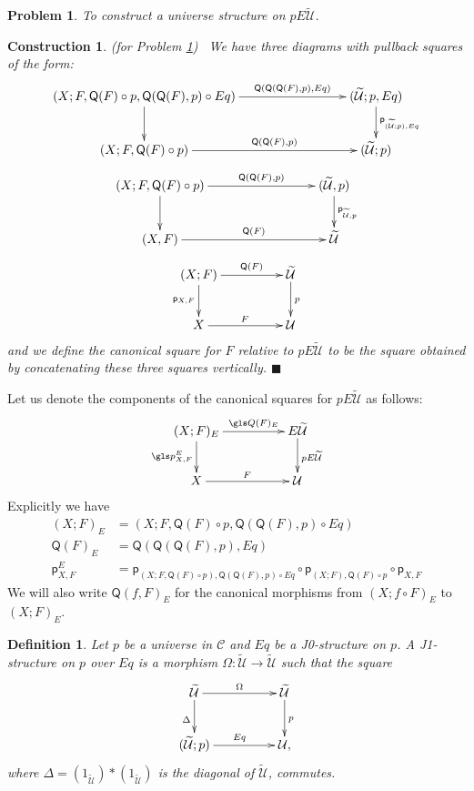 \documentclass[12pt]{article}
\numberwithin{equation}{section}
\newenvironment{eq}{\begin{equation}}{\end{equation}}
\newtheorem{definition}[proposition]{Definition}
\newtheorem{problem}[proposition]{Problem}
\newtheorem{construction0}[proposition]{Construction}
\newenvironment{construction}[1]{\begin{construction0}(for Problem \ref{#1})\ }{$\blacksquare$ \end{construction0}}
\newcommand{\llabel}[1]{\label{#1}}
\newcommand{\sr}{\rightarrow}
\newcommand{\wt}{\widetilde}
\newcommand{\C}{{\mathcal C}}  %
\newcommand{\id}{1}            %
\newcommand{\p}{\mathsf{p}}
\newcommand{\U}{\mathcal{U}}
\newcommand{\Q}{\mathsf{Q}}
\begin{document}
\begin{problem}
\llabel{2015.05.08.prob1} To construct a universe structure on $pE\wt{\U}$.
\end{problem}
%
\begin{construction}{2015.05.08.prob1}\rm
\llabel{2015.05.08.constr1} We have three diagrams with pullback squares of the
form:
%
$$
\begin{xy}
          \xymatrix@C=7pc{ (X;F,\Q(F)\circ p, \Q(\Q(F),p)\circ Eq)
            \ar[r]^-{\Q(\Q(\Q(F),p),Eq)} \ar[d] & (\wt{\U}; p, Eq)
            \ar[d]^{\p_{(\wt{\U};p),Eq}}\\ (X;F,\Q(F)\circ p) \ar[r]^-{\Q(\Q(F),p)}
            & (\wt{\U};p) }
\end{xy}
$$
$$
\begin{xy}
          \xymatrix@C=7pc{ (X;F,\Q(F)\circ p) \ar[r]^-{\Q(\Q(F),p)} \ar[d] &
            (\wt{\U},p) \ar[d]^{\p_{\wt{\U},p}}\\ (X,F) \ar[r]^-{\Q(F)} & \wt{\U} }
\end{xy}
$$
$$
\begin{xy}
          \xymatrix@C=4pc{ (X;F) \ar[r]^-{\Q(F)} \ar[d]_{\p_{X,F}} & \wt{\U}
            \ar[d]^{p}\\ X \ar[r]^{F} & \U }
\end{xy}
$$
%
and we define the canonical square for $F$ relative to $pE\wt{\U}$ to be the
square obtained by concatenating these three squares vertically.
\end{construction}
%
Let us denote the components of the canonical squares for $pE\wt{\U}$ as
follows:
%
$$
\begin{xy}
          \xymatrix@C=4pc{ (X;F)_{E} \ar[r]^-{\gls Q(F)_{E}} \ar[d]_{\gls p^E_{X,F}} &
            E\wt{\U} \ar[d]^{pE\wt{\U}}\\ X \ar[r]^{F} & \U }
\end{xy}
$$
%
Explicitly we have
%
\begin{align*}
  (X;F)_{E}&=(X;F,\Q(F)\circ p, \Q(\Q(F),p)\circ Eq) \\
  \Q(F)_{E}&=\Q(\Q(\Q(F),p),Eq) \\
  \p_{X,F}^E&=\p_{(X;F,\Q(F)\circ p),\Q(\Q(F),p)\circ Eq}\circ \p_{(X;F),\Q(F)\circ p}\circ \p_{X,F}
\end{align*}
%
We will also write $\Q(f,F)_{E}$ for the canonical morphisms from $(X;f\circ
F)_{E}$ to $(X;F)_{E}$.
%
\begin{definition}
\llabel{2015.03.27.def5} Let $p$ be a universe in $\C$ and $Eq$ be a
J0-structure on $p$. A J1-structure on $p$ over $Eq$ is a morphism
$\Omega:\wt{\U}\sr \wt{\U}$ such that the square
%
\begin{eq}\llabel{2015.03.27.sq1}
\begin{xy}
          \xymatrix@C=4pc{ \wt{\U} \ar[r]^-{\Omega} \ar[d]_{\Delta} & \wt{\U}
            \ar[d]^{p}\\ (\wt{\U};p) \ar[r]^{Eq} & \U, }
\end{xy}
\end{eq}%
%
where $\Delta=(\id_{\wt{\U}})*(\id_{\wt{\U}})$ is the diagonal of $\wt{\U}$,
commutes.
\end{definition}
%
\end{document}
